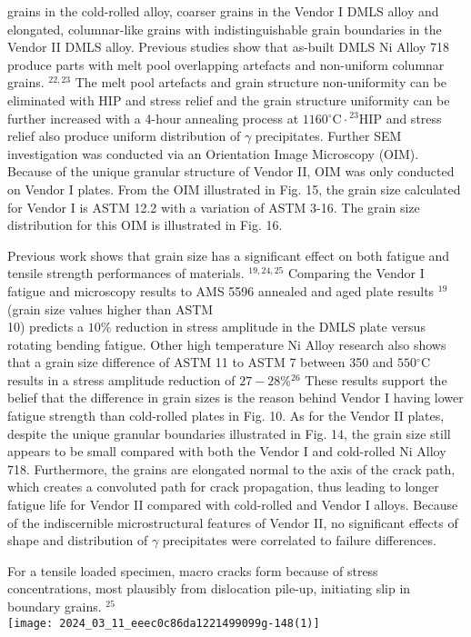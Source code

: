 \documentclass[10pt]{article}
\begin{document}
grains in the cold-rolled alloy, coarser grains in the Vendor I DMLS alloy and elongated, columnar-like grains with indistinguishable grain boundaries in the Vendor II DMLS alloy. Previous studies show that as-built DMLS Ni Alloy 718 produce parts with melt pool overlapping artefacts and non-uniform columnar grains. ${ }^{22,23}$ The melt pool artefacts and grain structure non-uniformity can be eliminated with HIP and stress relief and the grain structure uniformity can be further increased with a 4-hour annealing process at $1160{ }^{\circ} \mathrm{C} \cdot{ }^{23} \mathrm{HIP}$ and stress relief also produce uniform distribution of $\gamma$ precipitates. Further SEM investigation was conducted via an Orientation Image Microscopy (OIM). Because of the unique granular structure of Vendor II, OIM was only conducted on Vendor I plates. From the OIM illustrated in Fig. 15, the grain size calculated for Vendor I is ASTM 12.2 with a variation of ASTM 3-16. The grain size distribution for this OIM is illustrated in Fig. 16.

Previous work shows that grain size has a significant effect on both fatigue and tensile strength performances of materials. ${ }^{19,24,25}$ Comparing the Vendor I fatigue and microscopy results to AMS 5596 annealed and aged plate results ${ }^{19}$ (grain size values higher than ASTM\\
10) predicts a $10 \%$ reduction in stress amplitude in the DMLS plate versus rotating bending fatigue. Other high temperature $\mathrm{Ni}$ Alloy research also shows that a grain size difference of ASTM 11 to ASTM 7 between 350 and $550{ }^{\circ} \mathrm{C}$ results in a stress amplitude reduction of $27-28 \%{ }^{26}$ These results support the belief that the difference in grain sizes is the reason behind Vendor I having lower fatigue strength than cold-rolled plates in Fig. 10. As for the Vendor II plates, despite the unique granular boundaries illustrated in Fig. 14, the grain size still appears to be small compared with both the Vendor I and cold-rolled Ni Alloy 718. Furthermore, the grains are elongated normal to the axis of the crack path, which creates a convoluted path for crack propagation, thus leading to longer fatigue life for Vendor II compared with cold-rolled and Vendor I alloys. Because of the indiscernible microstructural features of Vendor II, no significant effects of shape and distribution of $\gamma$ precipitates were correlated to failure differences.

For a tensile loaded specimen, macro cracks form because of stress concentrations, most plausibly from dislocation pile-up, initiating slip in boundary grains. ${ }^{25}$\\
\texttt{[image: 2024\_03\_11\_eeec0c86da1221499099g-148(1)]}
\end{document}
